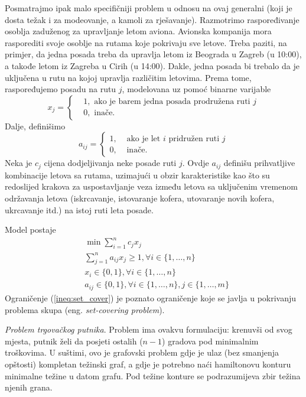 \documentclass[a4paper, utf8, 11pt, colorlinks]{article}
\begin{document}
Posmatrajmo ipak malo specifičniji problem u odnosu na ovaj generalni (koji je dosta težak i za modeovanje, a kamoli za rješavanje). 
Razmotrimo raspoređivanje osoblja zaduženog za upravljanje letom aviona. 
Avionska kompanija mora rasporediti svoje osoblje na rutama koje pokrivaju sve letove. Treba paziti, na primjer, da jedna posada treba da upravlja letom iz  Beograda u Zagreb (u 10:00), a takođe letom iz Zagreba u Cirih (u 14:00). Dakle, jedna posada bi trebalo da je uključena u rutu na kojoj upravlja različitim letovima. Prema tome, raspoređujemo posadu na rutu $j$, modelovana uz pomoć binarne varijable 
$$x_j = \begin{cases}
    &1, \mbox{ ako je barem jedna posada prodružena ruti } j \\
    &0, \mbox{ inače}. 
\end{cases}
$$
Dalje, definišimo 
$$a_{ij}= \begin{cases}
             1,& \mbox{ ako je let } i \mbox{ pridružen ruti } j \\
             0,& \mbox{ inače}.
        \end{cases}
$$
Neka je $c_j$ cijena dodjeljivanja neke posade ruti $j$. Ovdje $a_{ij}$ definišu prihvatljive kombinacije letova sa rutama, uzimajući u obzir  karakteristike kao što su redoslijed krakova za uspostavljanje veza između letova sa uključenim vremenom  održavanja letova (iskrcavanje, istovaranje kofera, utovaranje novih kofera, ukrcavanje itd.) na istoj ruti leta posade.   

Model postaje 
\begin{align}
    &\min \sum_{i=1}^n c_j x_j \nonumber\\
    & \sum_{j=1}^n a_{ij} x_j \geq 1, \forall i \in \{1,\ldots, n\} \label{ineq:set_cover} \\
    & x_i \in \{0, 1 \}, \forall i \in \{1, \ldots, n\} \\
    & a_{ij} \in \{0, 1\}, \forall i \in \{1, \ldots, n\}, j \in\{1,\ldots, m\} \nonumber
\end{align}
Ograničenje (\ref{ineq:set_cover}) je poznato ograničenje koje se javlja u pokrivanju problema skupa (eng. \emph{set-covering problem}).

\emph{Problem trgovačkog putnika}. Problem ima ovakvu formulaciju: krenuvši od svog mjesta, putnik želi da posjeti ostalih ($n-1$) gradova pod minimalnim troškovima. U suštimi, ovo je grafovski problem gdje je ulaz (bez smanjenja opštosti) kompletan težinski graf, a gdje je potrebno naći hamiltonovu konturu minimalne težine u datom grafu. Pod težine konture se podrazumijeva zbir težina njenih grana. 
\end{document}
